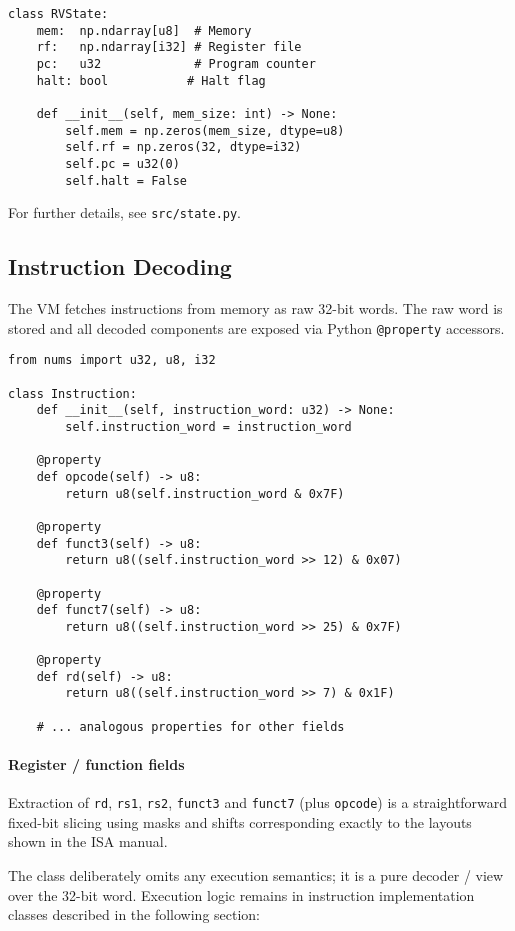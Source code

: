 \documentclass[sigconf]{acmart}
\begin{document}
\begin{verbatim}
class RVState:
    mem:  np.ndarray[u8]  # Memory
    rf:   np.ndarray[i32] # Register file
    pc:   u32             # Program counter
    halt: bool           # Halt flag

    def __init__(self, mem_size: int) -> None:
        self.mem = np.zeros(mem_size, dtype=u8)
        self.rf = np.zeros(32, dtype=i32)
        self.pc = u32(0)
        self.halt = False
\end{verbatim}
For further details, see \texttt{src/state.py}.

\subsection{Instruction Decoding}
The VM fetches instructions from memory as raw 32-bit words. The raw word is stored and all decoded components are exposed via Python \texttt{@property} accessors.

\begin{verbatim}
from nums import u32, u8, i32

class Instruction:
    def __init__(self, instruction_word: u32) -> None:
        self.instruction_word = instruction_word

    @property
    def opcode(self) -> u8:
        return u8(self.instruction_word & 0x7F)

    @property
    def funct3(self) -> u8:
        return u8((self.instruction_word >> 12) & 0x07)

    @property
    def funct7(self) -> u8:
        return u8((self.instruction_word >> 25) & 0x7F)

    @property
    def rd(self) -> u8:
        return u8((self.instruction_word >> 7) & 0x1F)

    # ... analogous properties for other fields
\end{verbatim}

\paragraph{Register / function fields} Extraction of \texttt{rd}, \texttt{rs1}, \texttt{rs2}, \texttt{funct3} and \texttt{funct7} (plus \texttt{opcode}) is a straightforward fixed-bit slicing using masks and shifts corresponding exactly to the layouts shown in the ISA manual. \cite{riscv-spec}

The class deliberately omits any execution semantics; it is a pure decoder / view over the 32-bit word. Execution logic remains in instruction implementation classes described in the following section:
\end{document}
